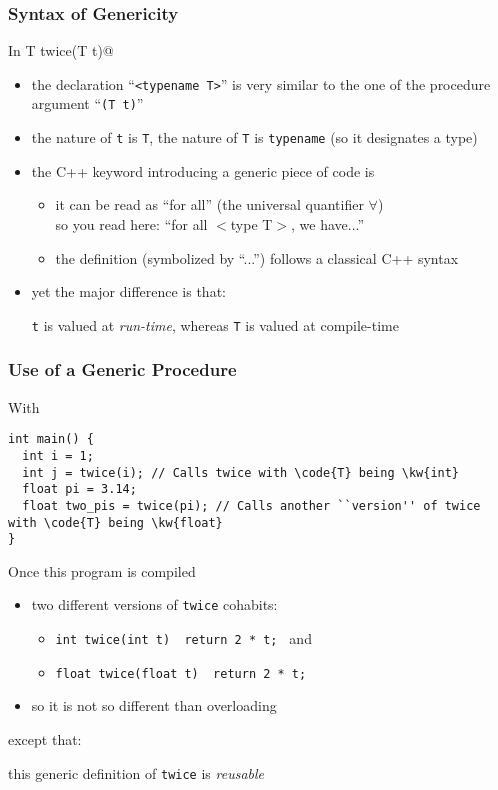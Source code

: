 \documentclass{beamer}
\newcommand{\cpp}{{C++}\xspace}
\newcommand{\kw}[1]{{\color{blue}{\texttt{#1}}}\xspace}
\newcommand{\code}[1]{{\scriptsize{\texttt{#1}}}\xspace}
\begin{document}
\begin{frame}[fragile]
  \frametitle{Syntax of Genericity}

In  T twice(T t)@
%
\begin{itemize}
\item the declaration ``\code{<typename T>}'' is very similar to the
  one of the procedure argument ``\code{(T t)}''
%
\item the nature of \code{t} is \code{T}, the nature of \code{T} is
  \code{typename} (so it designates a type)
%
\item the \cpp keyword introducing a generic piece of code is
  \kw{template}
  \begin{itemize}
  \item it can be read as ``for all'' (the universal quantifier $\forall$)\\
    so you read here: ``for all $<$type T$>$, we have...''
  \item the definition (symbolized by ``...'') follows a classical
    \cpp syntax
  \end{itemize}
%
\item yet the major difference is that:
  \begin{center}
    \code{t} is valued at \emph{run-time}, whereas \code{T} is valued at compile-time
  \end{center}
\end{itemize}

\end{frame}


\begin{frame}[fragile]
  \frametitle{Use of a Generic Procedure}

With
\begin{lstlisting}
int main() {
  int i = 1;
  int j = twice(i); // Calls twice with \code{T} being \kw{int}
  float pi = 3.14;
  float two_pis = twice(pi); // Calls another ``version'' of twice with \code{T} being \kw{float}
}
\end{lstlisting}


Once this program is compiled
\begin{itemize}
\item two different versions of \code{twice} cohabits:
  \begin{itemize}
  \item \code{int   twice(int   t) { return 2 * t; }} and
  \item \code{float twice(float t) { return 2 * t; }}
  \end{itemize}
\item so it is not so different than overloading
\end{itemize}

except that:
\begin{center}
  this generic definition of \code{twice} is \emph{reusable}
\end{center}

\end{frame}
\end{document}
